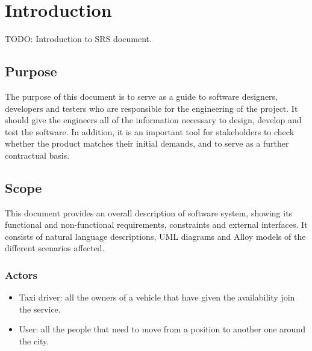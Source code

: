 \section{Introduction}      %
TODO: Introduction to \myTaxiService{} SRS document.
\subsection{Purpose}
The purpose of this document is to serve as a guide to software designers, developers and testers who are responsible for the engineering of the \myTaxiService{} project.
It should give the engineers all of the information necessary to design, develop and test the software.
In addition, it is an important tool for \myTaxiService{} stakeholders to check whether the product matches their initial demands, and to serve as a further contractual basis.
\subsection{Scope}
This document provides an overall description of \myTaxiService{} software system, showing its functional and non-functional requirements, constraints and external interfaces.
It consists of natural language descriptions, UML diagrams and Alloy models of the different scenarios affected.
\subsubsection{Actors}
\begin{itemize}
	\item Taxi driver: all the owners of a vehicle that have given the availability join the service.
	\item User: all the people that need to move from a position to another one around the city.
\end{itemize}
